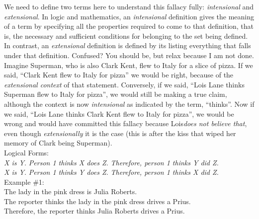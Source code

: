 \documentclass[a4paper,12pt,single,pdftex]{scrbook}
\begin{document}
    
      We need to define two terms here to understand this fallacy fully: {\it intensional}  and {\it extensional}.  In logic and mathematics, an {\it intensional}  definition gives the meaning of a term by specifying all the properties required to come to that definition, that is, the necessary and sufficient conditions for belonging to the set being defined.  In contrast, an {\it extensional} definition is defined by its listing everything that falls under that definition.  Confused?  You should be, but relax because I am not done.
    \\

    
      Imagine Superman, who is also Clark Kent, flew to Italy for a slice of pizza.  If we said, “Clark Kent flew to Italy for pizza” we would be right, because of the {\it extensional context} of that statement.  Conversely, if we said, “Lois Lane thinks Superman flew to Italy for pizza”, we would still be making a true claim, although the context is now {\it intensional} as indicated by the term, “thinks”.  Now if we said, “Lois Lane thinks Clark Kent flew to Italy for pizza”, we would be wrong and would have committed this fallacy because Lois{\it  does not believe that}, even though {\it extensionally} it is the case (this is after the kiss that wiped her memory of Clark being Superman).
    \\

    
      Logical Forms:
    \\

    
      {\em X is Y.} \newline
{\em Person 1 thinks X does Z.} \newline
{\em Therefore, person 1 thinks Y did Z.}
    \\

    
      {\em X is Y.} \newline
{\em Person 1 thinks Y does Z.} \newline
{\em Therefore, person 1 thinks X did Z.}
    \\

    
      Example \#1:
    \\

    
      The lady in the pink dress is Julia Roberts.
    \\

    
      The reporter thinks the lady in the pink dress drives a Prius.
    \\

    
      Therefore, the reporter thinks Julia Roberts drives a Prius.
    \\
\end{document}
